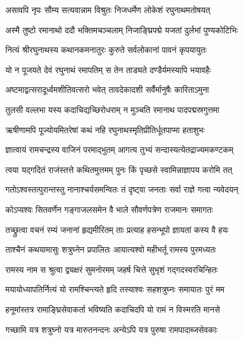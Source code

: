 

\twolineshloka
{असावपि नृपः सौम्य सत्यवान्नाम विश्रुतः}
{निजधर्मेण लोकेशं रघुनाथमतोषयत्}%

\twolineshloka
{अस्मै तुष्टो रमानाथो ददौ भक्तिमचञ्चलाम्}
{निजाङ्घ्रिपद्मे यजतां दुर्लभां पुण्यकोटिभिः}%

\twolineshloka
{नित्यं श्रीरघुनाथस्य कथानकमनातुरः}
{कुरुते सर्वलोकानां पावनं कृपयायुतः}%

\twolineshloka
{यो न पूजयते देवं रघुनाथं रमापतिम्}
{स तेन ताड्यते दण्डैर्यमस्यापि भयावहैः}%

\twolineshloka
{अष्टमाद्वत्सरादूर्ध्वमशीतिवत्सरो भवेत्}
{तावदेकादशी सर्वैर्मानुषैः कारिताऽमुना}%

\twolineshloka
{तुलसी वल्लभा यस्य कदाचिद्यच्छिरोधराम्}
{न मुञ्चति रमानाथ पादपद्मस्रगुत्तमा}%

\twolineshloka
{ऋषीणामपि पूज्योयमितरेषां कथं नहि}
{रघुनाथस्मृतिप्रीतिर्धूतपाप्मा हताशुभः}%

\twolineshloka
{ज्ञात्वायं रामचन्द्रस्य वाजिनं परमाद्भुतम्}
{आगत्य तुभ्यं सन्दास्यत्येतद्राज्यमकण्टकम्}%

\twolineshloka
{त्वया यद्गदितं राजंस्तत्ते कथितमुत्तमम्}
{पुनः किं पृच्छसे स्वामिन्नाज्ञापय करोमि तत्}%


\twolineshloka
{गतोऽश्वस्तत्पुरान्तस्तु नानाश्चर्यसमन्वितः}
{तं दृष्ट्वा जनताः सर्वा राज्ञे गत्वा न्यवेदयन्}%


\twolineshloka
{कोऽप्यश्वः सितवर्णेन गङ्गाजलसमेन वै}
{भाले सौवर्णपत्रेण राजमानः समागतः}%

\twolineshloka
{तच्छ्रुत्वा वचनं रम्यं जनानां हृद्यमीरितम्}
{ताः प्रत्याह हसन्भूपो ज्ञायतां कस्य वै हयः}%

\twolineshloka
{ताश्चैनं कथयामासुः शत्रुघ्नेन प्रपालितः}
{आयात्यश्वो महीभर्तू रामस्य पुरमध्यतः}%

\twolineshloka
{रामस्य नाम स श्रुत्वा द्व्यक्षरं सुमनोरमम्}
{जहर्ष चित्ते सुभृशं गद्गदस्वरचिन्हितः}%

\twolineshloka
{मयायोध्यापतिर्नित्यं यो रामश्चिन्त्यते हृदि}
{तस्याश्वः सहशत्रुघ्नः समायातः पुरं मम}%

\twolineshloka
{हनूमांस्तत्र रामाङ्घ्रिसेवाकर्ता भविष्यति}
{कदाचिदपि यो रामं न विस्मरति मानसे}%

\twolineshloka
{गच्छामि यत्र शत्रुघ्नो यत्र मारुतनन्दनः}
{अन्येऽपि यत्र पुरुषा रामपादाब्जसेवकाः}%

